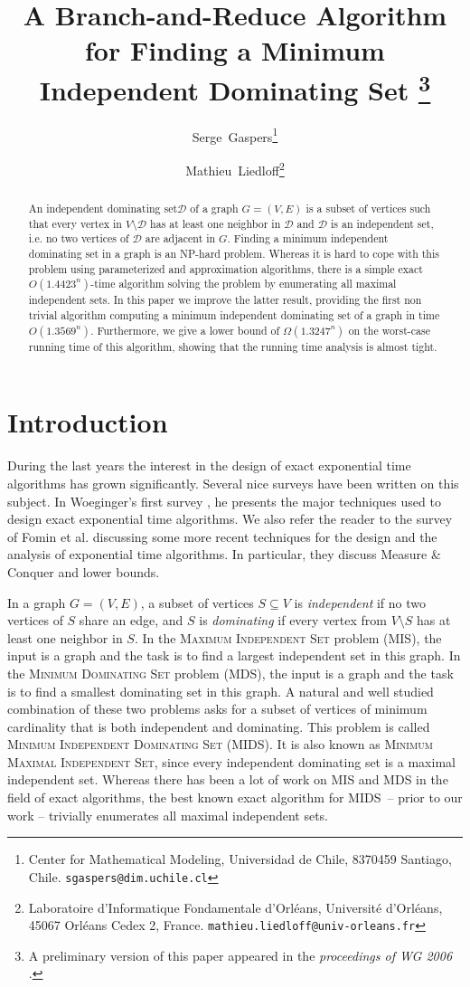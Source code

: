 \documentclass[a4paper,10pt]{article}
\title{A Branch-and-Reduce Algorithm for Finding a Minimum Independent
Dominating Set
\footnote{A preliminary version of this paper appeared in the
\textit{proceedings of WG 2006} \cite{WG2006}.}
}
\author{Serge~Gaspers\thanks{Center for Mathematical Modeling,
Universidad de Chile, 8370459 Santiago, Chile.
\texttt{sgaspers@dim.uchile.cl}}
\and Mathieu~Liedloff\thanks{Laboratoire d'Informatique Fondamentale d'Orl\'eans,
Universit{\'e} d'Orl{\'e}ans, 45067 Orl{\'e}ans Cedex 2, France.
\texttt{mathieu.liedloff@univ-orleans.fr}}
}
\date{}
\theoremstyle{plain}
\theoremstyle{definition}
\theoremstyle{remark}
\newcommand{\ids}{independent dominating set\xspace}
\newcommand{\MIDSpb}{\textsc{MIDS}\xspace}
\newcommand{\MISpb}{\textsc{MIS}\xspace}
\newcommand{\MDSpb}{\textsc{MDS}\xspace}
\newcommand{\runtime}{1.3569}
\begin{document}
\SetAlgoSkip{}

\maketitle



\begin{abstract}
An \ids $\mathcal{D}$ of a graph $G=(V,E)$ is a subset of vertices such that
every vertex in $V \setminus \mathcal{D}$ has at least one neighbor in $\mathcal{D}$ and
$\mathcal{D}$ is an independent set, i.e. no two vertices of $\mathcal{D}$
are adjacent in $G$. Finding a minimum \ids in a graph is an NP-hard problem.
Whereas it is hard to cope with this problem using parameterized
and approximation algorithms, there is a simple exact $O(1.4423^n)$-time algorithm
solving the problem by enumerating all maximal independent sets.
In this paper we improve the latter result, providing the first non trivial algorithm computing a minimum \ids of a
graph in time $O(\runtime^n)$.
Furthermore, we give a lower bound of $\Omega(1.3247^n)$ on the worst-case running time of this algorithm,
showing that the running time analysis is almost tight.
\end{abstract} 


\section{Introduction}


During the last years the interest in the design of
exact exponential time algorithms has grown significantly.
Several nice surveys have been written on this subject.
In Woeginger's first survey \cite{Woeginger}, he presents the
major techniques used to design exact exponential time algorithms.
We also refer the reader to the survey of Fomin et al. \cite{SurveyFGK}
discussing some more recent techniques for the design and the analysis of exponential time algorithms. 
In particular, they discuss Measure \& Conquer and lower bounds.

In a graph $G=(V,E)$, a subset of vertices $S\subseteq V$ is \emph{independent} if no two vertices
of $S$ share an edge, and $S$ is \emph{dominating} if every vertex from $V\setminus S$ has at least one neighbor
in $S$.
In the \textsc{Maximum Independent Set} problem (\MISpb), the input is a graph and the task is to find a largest
independent set in this graph. In the \textsc{Minimum Dominating Set} problem (\MDSpb), the input is
a graph and the task is to find a smallest dominating set in this graph.
A natural and well studied combination of these two problems asks for a subset of vertices
of minimum cardinality that is both independent and dominating. This problem is called
\textsc{Minimum Independent Dominating Set} (\MIDSpb).
It is also known as
\textsc{Minimum Maximal Independent Set}, since every \ids is a maximal independent set.
Whereas there has been a lot of work on \MISpb and \MDSpb
in the field of exact algorithms, the best known exact algorithm for
\MIDSpb\ -- prior to our work -- trivially enumerates all maximal independent sets.
\end{document}
